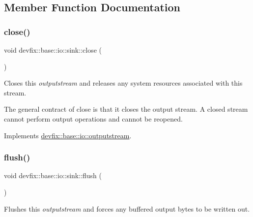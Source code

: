 \subsection{Member Function Documentation}
\mbox{\label{structdevfix_1_1base_1_1io_1_1sink_a2d110d27baa88f462540e7fd59fb8b3c}} 
\subsubsection{\texorpdfstring{close()}{close()}}
{\footnotesize\ttfamily void devfix\+::base\+::io\+::sink\+::close (\begin{DoxyParamCaption}{ }\end{DoxyParamCaption})\hspace{0.3cm}{\ttfamily [virtual]}}



Closes this {\itshape outputstream} and releases any system resources associated with this stream. 

The general contract of close is that it closes the output stream. A closed stream cannot perform output operations and cannot be reopened. 

Implements \hyperlink{structdevfix_1_1base_1_1io_1_1outputstream_a060c2e7040e6bb831b8150f64bd8abf7}{devfix\+::base\+::io\+::outputstream}.

\mbox{\label{structdevfix_1_1base_1_1io_1_1sink_abf208747c9be8295972fbc4696ddc557}} 
\subsubsection{\texorpdfstring{flush()}{flush()}}
{\footnotesize\ttfamily void devfix\+::base\+::io\+::sink\+::flush (\begin{DoxyParamCaption}{ }\end{DoxyParamCaption})\hspace{0.3cm}{\ttfamily [virtual]}}



Flushes this {\itshape outputstream} and forces any buffered output bytes to be written out. 

